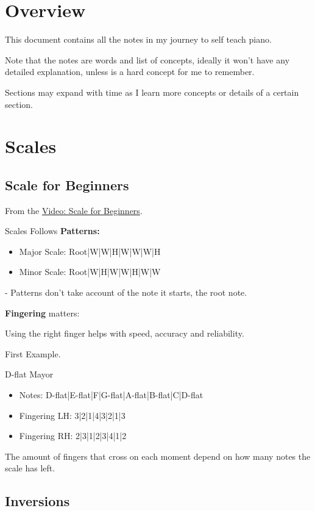 
\section{Overview}

This document contains all the notes in my journey to self teach piano.

Note that the notes are words and list of concepts, ideally it won't have any detailed explanation, unless is a hard concept for me to remember. 

Sections may expand with time as I learn more concepts or details of a certain section.

\section{Scales}

\subsection{Scale for Beginners}
From the \href{https://www.youtube.com/watch?v=GugYaekR8KQ}{Video: Scale for Beginners}.

Scales Follows \textbf{Patterns:}
\begin{itemize}
    \item Major Scale: Root|W|W|H|W|W|W|H 
    \item Minor Scale: Root|W|H|W|W|H|W|W
\end{itemize}

- Patterns don't take account of the note it starts, the root note.

\textbf{Fingering} matters:

Using the right finger helps with speed, accuracy and reliability.

First Example.

\begin{definitionbox}{D-flat Mayor}
    \begin{itemize}
        \item Notes: D-flat|E-flat|F|G-flat|A-flat|B-flat|C|D-flat
        \item Fingering LH: 3|2|1|4|3|2|1|3
        \item Fingering RH: 2|3|1|2|3|4|1|2
    \end{itemize}

\end{definitionbox}

The amount of fingers that cross on each moment depend on how many notes the scale has left.

\subsection{Inversions}

